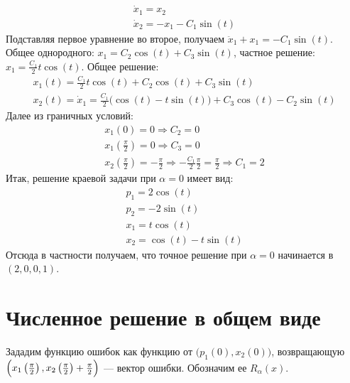 \documentclass{article}
\begin{document}
\begin{gather*}
  \dot x_{1} = x_{2}\\
  \dot x_{2} = -x_{1} - C_{1}\sin(t)
\end{gather*}
Подставляя первое уравнение во второе, получаем
$\ddot x_{1} + x_{1} = -C_{1}\sin(t)$. Общее однородного:
$x_{1} = C_{2}\cos(t) + C_{3}\sin(t)$, частное решение:
$x_{1} = \frac {C_{1}}{2} t \cos(t)$. Общее решение:
\begin{gather*}
x_{1}(t) = \frac {C_{1}}{2} t \cos(t) + C_{2}\cos(t) + C_{3}\sin(t)\\
x_{2}(t) =\dot x_{1} = \frac {C_{1}}{2} \big(\cos(t) - t\sin(t)\big) + C_{3}\cos(t) - C_{2}\sin(t)
\end{gather*}
Далее из граничных условий:
\begin{gather*}
  x_{1}(0) = 0 \Rightarrow C_{2} = 0\\
  x_{1}\left(\frac \pi 2\right) = 0 \Rightarrow C_{3} = 0\\
  x_{2}\left(\frac \pi 2\right) = -\frac \pi 2 \Rightarrow -\frac{C_{1}}{2}\frac{\pi}2 = \frac \pi 2 \Rightarrow C_{1} = 2
\end{gather*}
Итак, решение краевой задачи при $\alpha = 0$ имеет вид:
\begin{gather*}
  p_{1} = 2\cos(t)\\
  p_{2} = -2\sin(t)\\
  x_{1} = t\cos(t)\\
  x_{2} = \cos(t) - t\sin(t)
\end{gather*}
Отсюда в частности получаем, что точное решение при $\alpha = 0$ начинается в $(2, 0, 0, 1)$.
\section{Численное решение в общем виде}
Зададим функцию ошибок как функцию от $\big(p_{1}(0), x_{2}(0)\big)$, возвращающую
$\Bigl(x_{1}\left(\frac \pi 2\right), x_{2}\left(\frac \pi 2\right) + \frac \pi 2\Bigr)$ --- вектор
ошибки. Обозначим ее $R_{\alpha}(x)$.
\end{document}
